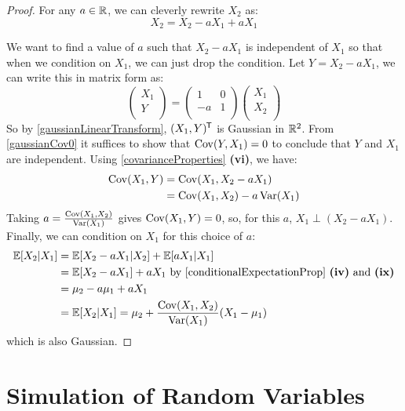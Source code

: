 \documentclass[../main.tex]{subfiles}
\begin{document}
\begin{proof}
  For any $a \in \mathbb{R}$, we can cleverly rewrite $X_2$ as:
  \[
    X_2 = X_2 - a X_1 + a X_1
  \]

  We want to find a value of $a$ such that $X_2 - aX_1$ is independent of $X_1$ so that when we condition on $X_1$, we can just drop the condition.
  Let $Y = X_2 - aX_1$, we can write this in matrix form as:
  \[
    \begin{pmatrix}
    X_1 \\
    Y \\
    \end{pmatrix} = \begin{pmatrix}
    1 & 0 \\
    -a & 1 \\
    \end{pmatrix} \begin{pmatrix}
    X_1 \\
    X_2 \\
    \end{pmatrix}
  \]
  So by \cref{gaussianLinearTransform}, $(X_1, Y)^{{\mkern-1.5mu\mathsf{T}}}$ is Gaussian in $\mathbb{R}^2$.
  From \cref{gaussianCov0} it suffices to show that $\operatorname{Cov}(Y, X_1) = 0$ to conclude that $Y$ and $X_1$ are independent.
  Using \cref{covarianceProperties} \textbf{(vi)}, we have:
  \begin{align*}
    \operatorname{Cov}(X_1, Y) &= \operatorname{Cov}(X_1, X_2 - aX_1) \\
                 &= \operatorname{Cov}(X_1, X_2) - a\operatorname{Var}(X_1)
  \end{align*}
  Taking $a = \frac{\operatorname{Cov}(X_1, X_2)}{\operatorname{Var}(X_1)}$ gives $\operatorname{Cov}(X_1, Y) = 0$, so, for this $a$, $X_1 \perp (X_2 - aX_1)$.
  Finally, we can condition on $X_1$ for this choice of $a$:
  \begin{align*}
    \E[X_2 \vert X_1] &= \E[X_2 - aX_1 \vert X_2] + \E[aX_1 \vert X_1] \\
                      &= \E[X_2 - aX_1] + aX_1 \text{ by \cref{conditionalExpectationProp} \textbf{(iv)} and \textbf{(ix)}} \\
                      &= \mu_2 - a\mu_1 + aX_1 \\
                      &= \E[X_2 \vert X_1] = \mu_2 + \frac{\Cov(X_1, X_2)}{\Var(X_1)}(X_1 - \mu_1)
  \end{align*}
  which is also Gaussian.
\end{proof}
\section{Simulation of Random Variables}
\end{document}
